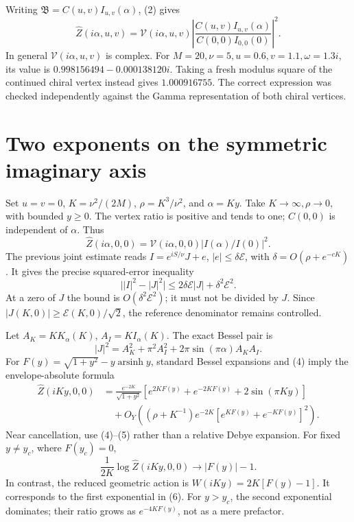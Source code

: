 \documentclass[11pt,a4paper]{article}
\newcommand{\E}{\mathcal E}
\newcommand{\B}{\mathfrak B}
\begin{document}
Writing \(\B=C(u,v)I_{u,v}(\alpha)\), (2) gives
\[
 \widehat Z(i\alpha,u,v)=\mathcal V(i\alpha,u,v)
 \left|\frac{C(u,v)I_{u,v}(\alpha)}{C(0,0)I_{0,0}(0)}\right|^2 .
\]
In general \(\mathcal V(i\alpha,u,v)\) is complex.
For \(M=20,\nu=5,u=0.6,v=1.1,\omega=1.3i\), its value is
\(0.998156494-0.000138120i\).
Taking a fresh modulus square of the continued chiral vertex instead
gives \(1.000916755\).
The correct expression was checked independently against
the Gamma representation of both chiral vertices.

\newpage
\section{Two exponents on the symmetric imaginary axis}
Set \(u=v=0\), \(K=\nu^2/(2M)\), \(\rho=K^3/\nu^2\), and \(\alpha=Ky\).
Take \(K\to\infty,\rho\to0\), with bounded \(y\ge0\).
The vertex ratio is positive and tends to one; \(C(0,0)\) is independent
of \(\alpha\). Thus
\[
 \widehat Z(i\alpha,0,0)=\mathcal V(i\alpha,0,0)|I(\alpha)/I(0)|^2 .
\]
The previous joint estimate reads \(I=e^{iS/\nu}J+e\), \(|e|\le\delta\E\),
with \(\delta=O(\rho+e^{-cK})\).
It gives the precise squared-error inequality
\[
 \big||I|^2-|J|^2\big|\le2\delta\E|J|+\delta^2\E^2.                 \tag{4}
\]
At a zero of \(J\) the bound is \(O(\delta^2\E^2)\); it must not
be divided by \(J\).
Since \(|J(K,0)|\ge\E(K,0)/\sqrt2\), the reference denominator
remains controlled.

Let \(A_K=KK_\alpha(K)\), \(A_I=KI_\alpha(K)\).
The exact Bessel pair is
\[
 |J|^2=A_K^2+\pi^2A_I^2+
                   2\pi\sin(\pi\alpha)A_KA_I.                    \tag{5}
\]
For \(F(y)=\sqrt{1+y^2}-y\operatorname{arsinh}y\),
standard Bessel expansions \cite{dlmf} and (4) imply the
envelope-absolute formula
\begin{align*}
 \widehat Z(iKy,0,0)
 &=\frac{e^{-2K}}{\sqrt{1+y^2}}
   \left[e^{2KF(y)}+e^{-2KF(y)}+2\sin(\pi Ky)\right]\\
 &\quad+O_Y\!\left((\rho+K^{-1})e^{-2K}
                         [e^{KF(y)}+e^{-KF(y)}]^2\right).          \tag{6}
\end{align*}
Near cancellation, use (4)--(5) rather than a relative Debye expansion.
For fixed \(y\ne y_c\), where \(F(y_c)=0\),
\[
 \frac{1}{2K}\log\widehat Z(iKy,0,0)\longrightarrow |F(y)|-1 .
                                                                    \tag{7}
\]
In contrast, the reduced geometric action is
\(W(iKy)=2K[F(y)-1]\).
It corresponds to the first exponential in (6).
For \(y>y_c\), the second exponential dominates; their ratio grows
as \(e^{-4KF(y)}\), not as a mere prefactor.
\end{document}
